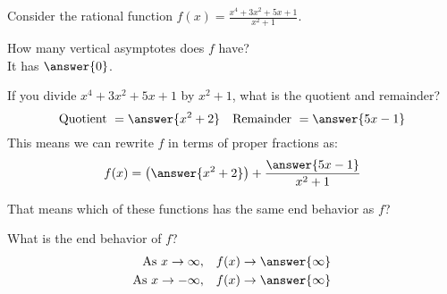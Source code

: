 \documentclass{ximera}
\begin{document}
Consider the rational function $\displaystyle f(x) = \frac{x^4+3x^2+5x+1}{x^2+1}$.

\begin{exercise}
	How many vertical asymptotes does $f$ have? \\
	
	It has $\answer{0}$.
\end{exercise}
	
\begin{exercise}
	If you divide $x^4+3x^2+5x+1$ by $x^2+1$, what is the quotient and remainder?
	\[\text{Quotient} \,\, = \answer{x^2+2} \quad \text{Remainder} \,\, = \answer{5x-1}\]
	This means we can rewrite $f$ in terms of proper fractions as:
	\[ f(x) = \left(\answer{x^2+2}\right) + \frac{\answer{5x-1}}{x^2+1} \]
	\begin{exercise}
		That means which of these functions has the same end behavior as $f$?
		\begin{multipleChoice}
		\end{multipleChoice}
		\begin{exercise}
			What is the end behavior of $f$?
			\begin{align*}
				\text{As} \,\, x \to \infty, &\quad f(x) \to \answer{\infty}\\
				\text{As} \,\, x \to -\infty, &\quad f(x) \to \answer{\infty}\\
			\end{align*}	
		\end{exercise}
	\end{exercise}	
\end{exercise}
	
\end{document}
